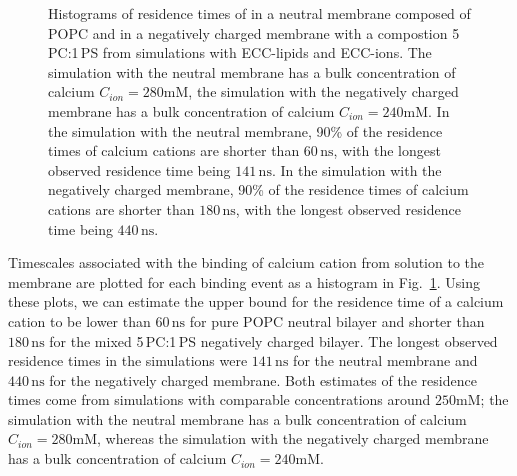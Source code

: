\begin{figure}[tb!]
{}\hfill
  \hfill
  \caption{\label{fig:hist_residence_times}
   Histograms of residence times of  
   in a neutral membrane composed of POPC
   and in a negatively charged membrane with a compostion 5\,PC:1\,PS
   from simulations with ECC-lipids and ECC-ions.
   The simulation with the neutral membrane has a bulk concentration of calcium $C_{ion} = 280\mathrm{mM}$, 
   the simulation with the negatively charged membrane has a bulk concentration of calcium $C_{ion} = 240\mathrm{mM}$. 
   In the simulation with the neutral membrane, 
   90\% of the residence times of calcium cations are
   shorter than $60\,\mathrm{ns}$, %
   with the longest observed residence time being $141\,\mathrm{ns}$. 
   In the simulation with the negatively charged membrane, 
   90\% of the residence times of calcium cations are
   shorter than $180\,\mathrm{ns}$, %
   with the longest observed residence time being $440\,\mathrm{ns}$. 
   }
\end{figure}


Timescales associated with the binding of calcium cation from solution to the membrane
are plotted for each binding event as a histogram in Fig.~\ref{fig:hist_residence_times}. 
Using these plots, we can estimate the upper bound for the residence time of a calcium cation 
to be lower than $60\,\mathrm{ns}$ for pure POPC neutral bilayer 
and shorter than $180\,\mathrm{ns}$ for the mixed 5\,PC:1\,PS negatively charged bilayer. 
The longest observed residence times in the simulations were $141\,\mathrm{ns}$ for the neutral membrane 
and $440\,\mathrm{ns}$ for the negatively charged membrane. 
Both estimates of the residence times come from simulations with comparable concentrations around $250\mathrm{mM}$;
the simulation with the neutral membrane has a bulk concentration of calcium $C_{ion} = 280\mathrm{mM}$, 
whereas the simulation with the negatively charged membrane has a bulk concentration of calcium $C_{ion} = 240\mathrm{mM}$. 


